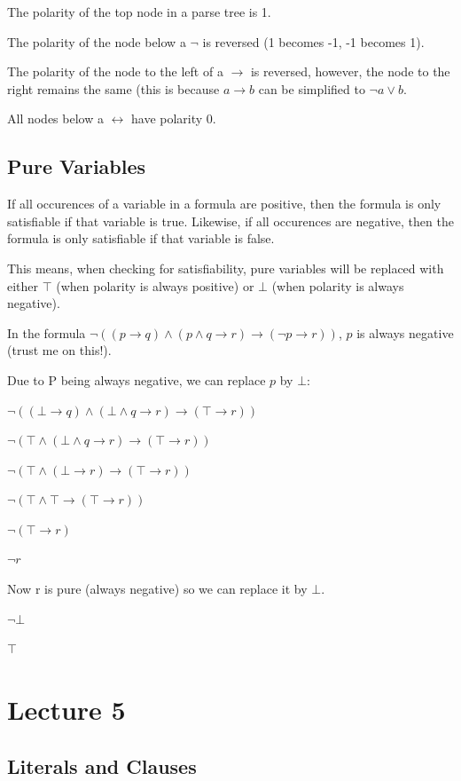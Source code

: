 \documentclass[11pt,a4paper]{article}
\begin{document}
The polarity of the top node in a parse tree is 1.

The polarity of the node below a $\neg$ is reversed (1 becomes -1, -1 becomes 1).

The polarity of the node to the left of a $\rightarrow$ is reversed, however, the node to the right remains the same (this is because $a \rightarrow b$ can be simplified to $\neg a \vee b$.

All nodes below a $\leftrightarrow$ have polarity 0.

\subsection{Pure Variables}

If all occurences of a variable in a formula are positive, then the formula is only satisfiable if that variable is true.
Likewise, if all occurences are negative, then the formula is only satisfiable if that variable is false.

This means, when checking for satisfiability, pure variables will be replaced with either $\top$ (when polarity is always positive) or $\bot$ (when polarity is always negative).

In the formula $\neg((p \rightarrow q) \wedge (p \wedge q \rightarrow r) \rightarrow (\neg p \rightarrow r))$, $p$ is always negative (trust me on this!).

Due to P being always negative, we can replace $p$ by $\bot$:

$\neg((\bot \rightarrow q) \wedge (\bot \wedge q \rightarrow r) \rightarrow (\top \rightarrow r))$

$\neg(\top \wedge (\bot \wedge q \rightarrow r) \rightarrow (\top \rightarrow r))$

$\neg(\top \wedge (\bot \rightarrow r) \rightarrow (\top \rightarrow r))$

$\neg(\top \wedge \top \rightarrow (\top \rightarrow r))$

$\neg(\top \rightarrow r)$

$\neg r$

Now r is pure (always negative) so we can replace it by $\bot$.

$\neg \bot$

$\top$

\section{Lecture 5}

\subsection{Literals and Clauses}
\end{document}
